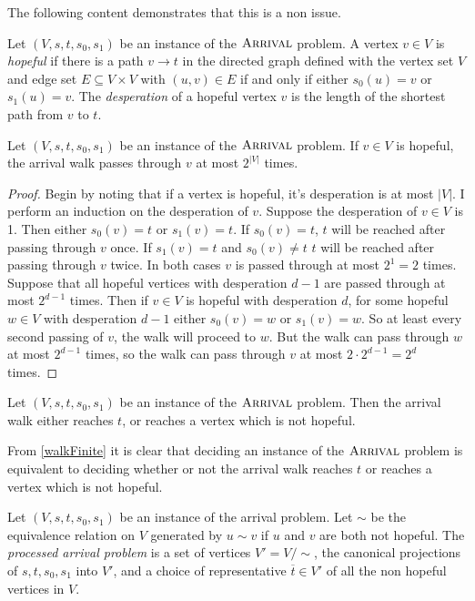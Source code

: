 The following content demonstrates that this is a non issue.
\begin{definition}
  Let $(V, s, t, s_0, s_1)$ be an instance of the $\textsc{Arrival}$ problem. A vertex $v \in V$
  is \emph{hopeful} if there is a path $v \to t$ in the directed graph defined with
  the vertex set $V$ and edge set $E \subseteq V \times V$ with $(u, v) \in E$ if and
  only if either $s_0(u) = v$ or $s_1(u) = v$. The \emph{desperation} of a hopeful vertex
  $v$ is the length of the shortest path from $v$ to $t$.
\end{definition}
\begin{lemma}
  Let $(V, s, t, s_0, s_1)$  be an instance of the $\textsc{Arrival}$ problem. If $v \in V$ is hopeful,
  the arrival walk passes through $v$ at most $2^{|V|}$ times.
\end{lemma}
\begin{proof}
  Begin by noting that if a vertex is hopeful, it's desperation is at most $|V|$. I perform
  an induction on the desperation of $v$. Suppose the desperation of $v \in V$ is 1. Then either
  $s_0(v) = t$ or $s_1(v) = t$. If $s_0(v) = t$, $t$ will be reached after passing through $v$ once.
  If $s_1(v) = t$ and $s_0(v) \neq t$ $t$ will be reached after passing through $v$ twice. In
  both cases $v$ is passed through at most $2^1 = 2$ times. \\
  Suppose that all hopeful vertices with desperation $d - 1$ are passed through at most $2^{d-1}$ times.
  Then if $v \in V$ is hopeful with desperation $d$, for some hopeful $w \in V$ with desperation
  $d - 1$ either $s_0(v) = w$ or $s_1(v) = w$. So at least every second passing of $v$, the
  walk will proceed to $w$. But the walk can pass through $w$ at most $2^{d-1}$ times,
  so the walk can pass through $v$ at most $2 \cdot 2^{d - 1} = 2^d$ times.
\end{proof}
\begin{cor}\label{walkFinite}
  Let $(V, s, t, s_0, s_1)$ be an instance of the $\textsc{Arrival}$ problem. Then the arrival
  walk either reaches $t$, or reaches a vertex which is not hopeful.
\end{cor}
From \cref{walkFinite} it is clear that deciding an instance of the $\textsc{Arrival}$ problem is
equivalent to deciding whether or not the arrival walk reaches $t$ or reaches a vertex which
is not hopeful.
\begin{definition}
  Let $(V, s, t, s_0, s_1)$ be an instance of the arrival problem. Let
  $\sim$ be the equivalence relation on $V$ generated by $u \sim v$ if
  $u$ and $v$ are both not hopeful.
  The \emph{processed arrival problem}
  is a set of vertices $V' = V / \sim$, the canonical projections of $s, t, s_0, s_1$ into $V'$,
  and a choice of representative $\overline{t} \in V'$ of all the non hopeful vertices in $V$.
\end{definition}
